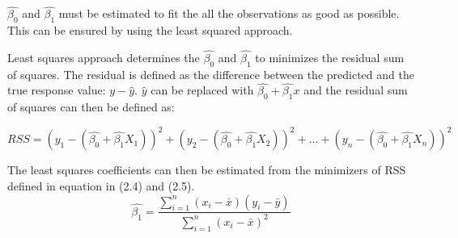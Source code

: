 



$\hat{\beta_0}$ and  $\hat{\beta_1}$ must be estimated to fit the all the observations as good as possible. This can be ensured by using the least squared approach.


Least squares approach determines the $\hat{\beta_0}$ and  $\hat{\beta_1}$ to minimizes the residual sum of squares.
The residual is defined as the difference between the predicted and the true response value: $y-\hat{y}$. $\hat{y}$ can be replaced with $\hat{\beta_0} + \hat{\beta_1}x$ and the residual sum of squares can then be defined as:

\begin{equation}
RSS = (y_1 - (\hat{\beta_0} + \hat{\beta_1}X_1))^2 + (y_2 - (\hat{\beta_0} + \hat{\beta_1}X_2))^2 + ... + (y_n - (\hat{\beta_0} + \hat{\beta_1}X_n))^2
\end{equation}


The least squares coefficients can then be estimated from the minimizers of RSS defined in equation in (2.4) and (2.5).
\begin{equation}
\hat{\beta_1} = \dfrac{\sum\limits_{i=1}^n(x_i - \bar{x})(y_i - \bar{y})}{\sum\limits_{i=1}^n(x_i - \bar{x})^2}
\end{equation}

